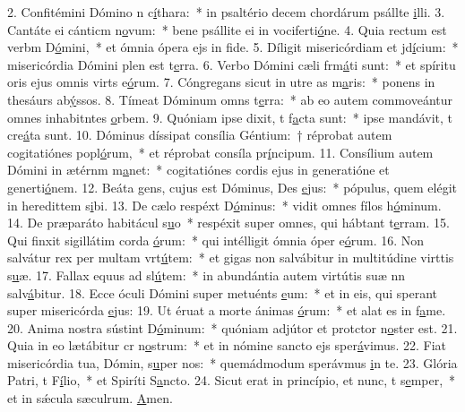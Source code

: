 2. Confitémini Dómino n c\uline{í}thara:~* in psaltério decem chordárum psállte \uline{i}lli.
3. Cantáte ei cánticm n\uline{o}vum:~* bene psállite ei in vociferti\uline{ó}ne.
4. Quia rectum est verbm D\uline{ó}mini,~* et ómnia ópera ejs in f\uline{i}de.
5. Díligit misericórdiam et jd\uline{í}cium:~* misericórdia Dómini plen est t\uline{e}rra.
6. Verbo Dómini cæli frm\uline{á}ti sunt:~* et spíritu oris ejus omnis virts e\uline{ó}rum.
7. Cóngregans sicut in utre as m\uline{a}ris:~* ponens in thesáurs ab\uline{ý}ssos.
8. Tímeat Dóminum omns t\uline{e}rra:~* ab eo autem commoveántur omnes inhabitntes \uline{o}rbem.
9. Quóniam ipse dixit, t f\uline{a}cta sunt:~* ipse mandávit, t cre\uline{á}ta sunt.
10. Dóminus díssipat consília Géntium:~† réprobat autem cogitatiónes popl\uline{ó}rum,~* et réprobat consíla pr\uline{í}ncipum.
11. Consílium autem Dómini in ætérnm m\uline{a}net:~* cogitatiónes cordis ejus in generatióne et generti\uline{ó}nem.
12. Beáta gens, cujus est Dóminus, Des \uline{e}jus:~* pópulus, quem elégit in heredittem s\uline{i}bi.
13. De cælo respéxt D\uline{ó}minus:~* vidit omnes fílos h\uline{ó}minum.
14. De præparáto habitácul s\uline{u}o~* respéxit super omnes, qui hábtant t\uline{e}rram.
15. Qui finxit sigillátim corda \uline{ó}rum:~* qui intélligit ómnia óper e\uline{ó}rum.
16. Non salvátur rex per multam vrt\uline{ú}tem:~* et gigas non salvábitur in multitúdine virttis s\uline{u}æ.
17. Fallax equus ad sl\uline{ú}tem:~* in abundántia autem virtútis suæ nn salv\uline{á}bitur.
18. Ecce óculi Dómini super metuénts \uline{e}um:~* et in eis, qui sperant super misericórda \uline{e}jus:
19. Ut éruat a morte ánimas \uline{ó}rum:~* et alat es in f\uline{a}me.
20. Anima nostra sústint D\uline{ó}minum:~* quóniam adjútor et protctor n\uline{o}ster est.
21. Quia in eo lætábitur cr n\uline{o}strum:~* et in nómine sancto ejs sper\uline{á}vimus.
22. Fiat misericórdia tua, Dómin, s\uline{u}per nos:~* quemádmodum sperávmus \uline{i}n te.
23. Glória Patri, t F\uline{í}lio,~* et Spiríti S\uline{a}ncto.
24. Sicut erat in princípio, et nunc, t s\uline{e}mper,~* et in sǽcula sæculrum. \uline{A}men.
